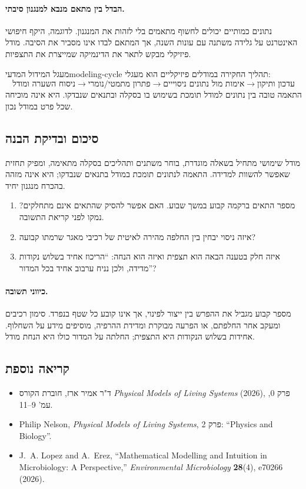 \paragraph{הבדל בין מתאם מנבא למנגנון סיבתי.}
נתונים כמותיים יכולים לחשוף מתאמים בלי לזהות את המנגנון. לדוגמה, היקף חיפושי האינטרנט על גלידה משתנה עם עונות השנה, אך המתאם לבדו אינו מסביר את הסיבה. מודל פיזיקלי מבקש לתאר את הדינמיקה שמייצרת את התצפיות.

\begin{definition}{מעגל המידול המדעי}{modeling-cycle}
תהליך החקירה במודלים פיזיקליים הוא מעגלי:
\begin{equation}
\text{ניסוח השערה ומודל} \longrightarrow \text{פתרון מתמטי/נומרי} \longrightarrow \text{אימות מול נתונים ניסוייים} \longrightarrow \text{עדכון ותיקון}
\end{equation}
התאמה טובה בין נתונים למודל תומכת בשימוש בו בסקלה ובתנאים שנבדקו. היא אינה מוכיחה שכל פרט במודל נכון.
\end{definition}

\subsection*{סיכום ובדיקת הבנה}
מודל שימושי מתחיל בשאלה מוגדרת, בוחר משתנים ותהליכים בסקלה מתאימה, ומפיק תחזית שאפשר להשוות למדידה. התאמה לנתונים תומכת במודל בתנאים שנבדקו; היא אינה מזהה בהכרח מנגנון יחיד.
\begin{enumerate}
\item מספר התאים ברקמה קבוע במשך שבוע. האם אפשר להסיק שהתאים אינם מתחלקים? נמקו לפני קריאת התשובה.
\item איזה ניסוי יבחין בין החלפה מהירה לאיטית של רכיבי מאגר שרמתו קבועה?
\item איזה חלק בטענה הבאה הוא תצפית ואיזה הוא הנחה: ``הריכוז אחיד בשלוש נקודות מדידה, ולכן נניח ערבוב אחיד בכל המדור''?
\end{enumerate}
\paragraph{כיווני תשובה.}
מספר קבוע מגביל את ההפרש בין ייצור לפינוי, אך אינו קובע כל שטף בנפרד. סימון רכיבים ומעקב אחר החלפתם, או הפרעה מבוקרת ומדידת ההרפיה, מוסיפים מידע על השחלוף. אחידות בשלוש הנקודות היא התצפית; החלתה על המדור כולו היא הנחת מודל.

\subsection*{קריאה נוספת}
\begingroup\small
\begin{itemize}
\item ד"ר אמיר ארז, חוברת הקורס \emph{Physical Models of Living Systems} (2026), פרק 0, עמ' 9--11.
\item Philip Nelson, \emph{Physical Models of Living Systems}, פרק 2: ``Physics and Biology''.
\item J.~A. Lopez and A.~Erez, ``Mathematical Modelling and Intuition in Microbiology: A Perspective,'' \emph{Environmental Microbiology} \textbf{28}(4), e70266 (2026).
\end{itemize}
\endgroup
